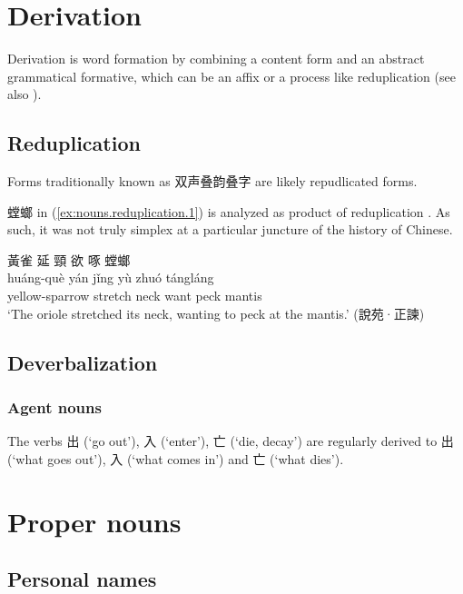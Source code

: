 \documentclass[UTF8, a4paper, oneside, scheme=plain, 12pt]{ctexrep}
\newcommand*{\citepage}[1]{p.~{#1}}
\newcommand{\translate}[1]{`#1'}
\begin{document}
\section{Derivation}

Derivation is word formation by combining a content form and an abstract grammatical formative,
which can be an affix or a process like reduplication (see also ).

\subsection{Reduplication}\label{sec:nouns.reduplication}

Forms traditionally known as 双声叠韵叠字 are likely repudlicated forms.

螳螂 in (\ref{ex:nouns.reduplication.1}) is analyzed as product of reduplication \citep[\citepage{93-95}]{sun2008reduplication}.
As such, it was not truly simplex at a particular juncture of the history of Chinese.

\begin{exe}
    \ex\label{ex:nouns.reduplication.1}
    \glll 黃雀 延 頸 欲 啄 螳螂 \\
    huáng-què yán jǐng yù zhuó tángláng \\
    yellow-sparrow stretch neck want peck mantis \\
    \glt\translate{The oriole stretched its neck, wanting to peck at the mantis.} \hfill (說苑·正諫)
\end{exe}


\subsection{Deverbalization}

\subsubsection{Agent nouns}

The verbs 出 (\translate{go out}), 入 (\translate{enter}), 亡 (\translate{die, decay})
are regularly derived to 出 (\translate{what goes out}), 入 (\translate{what comes in})
and 亡 (\translate{what dies}).


\section{Proper nouns}

\subsection{Personal names}
\end{document}
